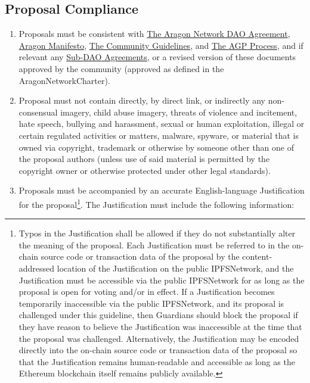 \subsection{Proposal Compliance}
\begin{enumerate}
	\item Proposals must be consistent with  
	\hyperref[chap:ANDAOAgreement]{The Aragon Network DAO Agreement}, 
	\hyperref[chap:AragonManifesto]{Aragon Manifesto}, 
	\hyperref[chap:CommunityGuidelines]{The Community Guidelines}, and 
	\hyperref[chap:AGPProcess]{The \ac{AGP} Process}, and if relevant any 
	\hyperref[chap:SubDAOAgreements]{Sub-\ac{DAO} Agreements}, 
	or a revised version of these documents approved by the community (approved as defined in the \gls{AragonNetworkCharter}).
	\item Proposal must not contain directly, by direct link, or indirectly any non-consensual imagery, child abuse imagery, threats of violence and incitement, hate speech, bullying and harassment, sexual or human exploitation, illegal or certain regulated activities or matters, malware, spyware, or material that is owned via copyright, trademark or otherwise by someone other than one of the proposal authors (unless use of said material is permitted by the copyright owner or otherwise protected under other legal standards).
	\item Proposals must be accompanied by an accurate English-language
	Justification for the proposal\footnote[1]{
		Typos in the Justification shall be allowed if they do not substantially alter the meaning of the proposal.
		Each Justification must be referred to in the on-chain source code or transaction data of the proposal by the content-addressed location of the Justification on the public \gls{IPFSNetwork}, and the Justification must be accessible via the public \gls{IPFSNetwork} for as long as the proposal is open for voting and/or in effect.
		If a Justification becomes temporarily inaccessible via the public \gls{IPFSNetwork}, and its proposal is challenged under this guideline, then \glspl{Guardian} should block the proposal if they have reason to believe the Justification was inaccessible at the time that the proposal was challenged.
		Alternatively, the Justification may be encoded directly into the on-chain source code or transaction data of the proposal so that the Justification remains human-readable and accessible as long as the Ethereum blockchain itself remains publicly available.
	}.
	The Justification must include the following information:
	\begin{enumerate}

\end{enumerate}
\end{enumerate}

